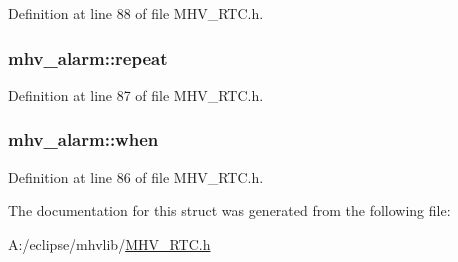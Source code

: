 \-Definition at line 88 of file \-M\-H\-V\-\_\-\-R\-T\-C.\-h.

\hypertarget{structmhv__alarm_ad8195c11cd5d6ff3bb37d01185c04af2}{
\subsubsection[{repeat}]{ {\bf mhv\-\_\-alarm\-::repeat}}}
\label{structmhv__alarm_ad8195c11cd5d6ff3bb37d01185c04af2}


\-Definition at line 87 of file \-M\-H\-V\-\_\-\-R\-T\-C.\-h.

\hypertarget{structmhv__alarm_acbab8b3b4efa4d891d598cbd5b47fb7c}{
\subsubsection[{when}]{ {\bf mhv\-\_\-alarm\-::when}}}
\label{structmhv__alarm_acbab8b3b4efa4d891d598cbd5b47fb7c}


\-Definition at line 86 of file \-M\-H\-V\-\_\-\-R\-T\-C.\-h.



\-The documentation for this struct was generated from the following file\-:\begin{DoxyCompactItemize}
\item 
\-A\-:/eclipse/mhvlib/\hyperlink{_m_h_v___r_t_c_8h}{\-M\-H\-V\-\_\-\-R\-T\-C.\-h}\end{DoxyCompactItemize}
